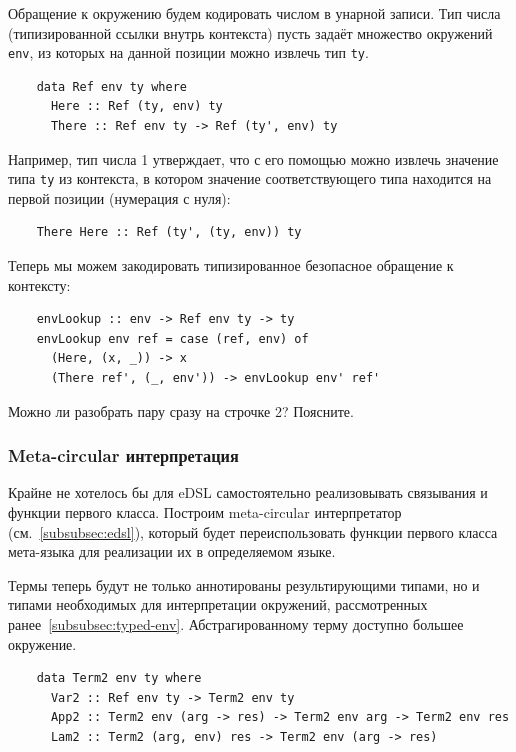 Обращение к окружению будем кодировать числом в унарной записи.
Тип числа (типизированной ссылки внутрь контекста) пусть задаёт множество окружений \texttt{env}, из которых на данной позиции можно извлечь тип \texttt{ty}.
\begin{verbatim}
    data Ref env ty where
      Here :: Ref (ty, env) ty
      There :: Ref env ty -> Ref (ty', env) ty
\end{verbatim}
Например, тип числа 1 утверждает, что с его помощью можно извлечь значение типа \texttt{ty} из контекста, в котором значение соответствующего типа находится на первой позиции (нумерация с нуля):
\begin{verbatim}
    There Here :: Ref (ty', (ty, env)) ty
\end{verbatim}

Теперь мы можем закодировать типизированное безопасное обращение к контексту:
\begin{verbatim}
    envLookup :: env -> Ref env ty -> ty
    envLookup env ref = case (ref, env) of
      (Here, (x, _)) -> x
      (There ref', (_, env')) -> envLookup env' ref'
\end{verbatim}

\begin{task}
    Можно ли разобрать пару сразу на строчке 2?
    Поясните.
\end{task}

\subsubsection{Meta-circular интерпретация} \label{subsubsec:meta-circular-initial}

Крайне не хотелось бы для eDSL самостоятельно реализовывать связывания и функции первого класса.
Построим meta-circular интерпретатор (см.~\ref{subsubsec:edsl}), который будет переиспользовать функции первого класса мета-языка для реализации их в определяемом языке.

Термы теперь будут не только аннотированы результирующими типами, но и типами необходимых для интерпретации окружений, рассмотренных ранее~\ref{subsubsec:typed-env}.
Абстрагированному терму доступно большее окружение.

\begin{verbatim}
    data Term2 env ty where
      Var2 :: Ref env ty -> Term2 env ty
      App2 :: Term2 env (arg -> res) -> Term2 env arg -> Term2 env res
      Lam2 :: Term2 (arg, env) res -> Term2 env (arg -> res)
\end{verbatim}

